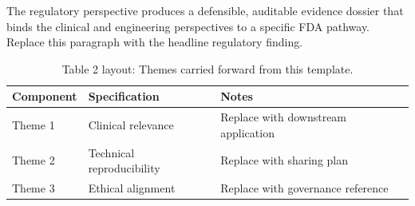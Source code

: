 
The regulatory perspective produces a defensible, auditable evidence dossier that binds the clinical and engineering perspectives to a specific FDA pathway. Replace this paragraph with the headline regulatory finding.

\begin{table}[H]
\caption{Table 2 layout: Themes carried forward from this template.}
\label{tab:conclusions_themes}
\centering
\begin{tabular}{>{\raggedright\arraybackslash}p{3.4cm} >{\raggedright\arraybackslash}p{4.6cm} >{\raggedright\arraybackslash}p{5.4cm}}
\toprule
\textbf{Component} & \textbf{Specification} & \textbf{Notes} \\
\midrule
  Theme 1 & Clinical relevance & Replace with downstream application \\
  Theme 2 & Technical reproducibility & Replace with sharing plan \\
  Theme 3 & Ethical alignment & Replace with governance reference \\
\bottomrule
\end{tabular}
\end{table}
